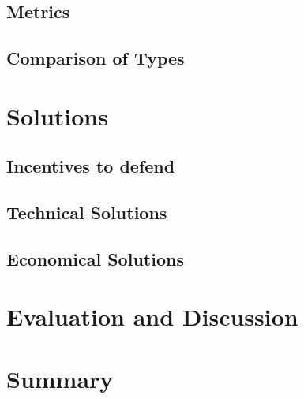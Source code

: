 	\subsection{Metrics}
	\subsection{Comparison of Types}

\section{Solutions}
	\subsection{Incentives to defend}
	\subsection{Technical Solutions}
	\subsection{Economical Solutions}
	






\section{Evaluation and Discussion}

\section{Summary}
